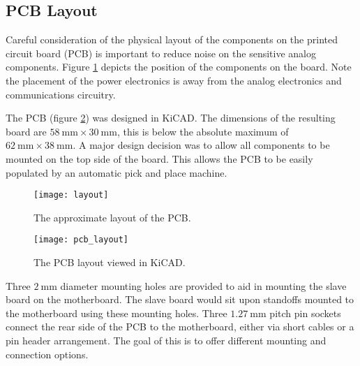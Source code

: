 \subsection{PCB Layout}
\label{sec:pcb-layout}

Careful consideration of the physical layout of the components on the printed circuit board (PCB) is important to reduce noise on the sensitive analog components.
Figure \ref{fig:layout} depicts the position of the components on the board.
Note the placement of the power electronics is away from the analog electronics and communications circuitry.

The PCB (figure \ref{fig:pcb-layout}) was designed in KiCAD.
The dimensions of the resulting board are $\SI{58}{\milli\metre}\times\SI{30}{\milli\metre}$, this is below the absolute maximum of $\SI{62}{\milli\metre}\times\SI{38}{\milli\metre}$.
A major design decision was to allow all components to be mounted on the top side of the board.
This allows the PCB to be easily populated by an automatic pick and place machine.
\begin{figure}[H]
	\centering
	\texttt{[image: layout]}
	\caption{The approximate layout of the PCB.}
	\label{fig:layout}
\end{figure}

\begin{figure}[H]
	\centering
	\texttt{[image: pcb\_layout]}
	\caption{The PCB layout viewed in KiCAD.}
	\label{fig:pcb-layout}
\end{figure}

Three $\SI{2}{\milli\metre}$ diameter mounting holes are provided to aid in mounting the slave board on the motherboard.
The slave board would sit upon standoffs mounted to the motherboard using these mounting holes.
Three $\SI{1.27}{\milli\metre}$ pitch pin sockets connect the rear side of the PCB to the motherboard, either via short cables or a pin header arrangement.
The goal of this is to offer different mounting and connection options.
